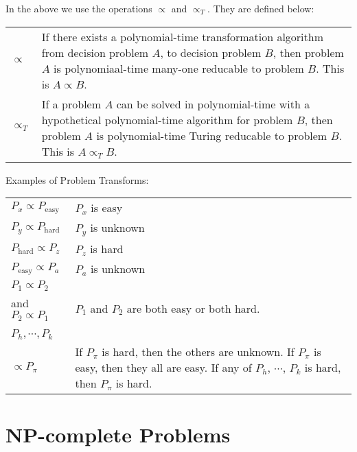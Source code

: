 \documentclass[aip, jmp, amsmath,amssymb, reprint]{revtex4-1}
\theoremstyle{definition}
\begin{document}
In the above we use the operations $\propto$ and $\propto_T$. They are defined below:
\begin{longtable}{p{2.2cm} p{6cm} }
    \textbf{$\propto$} & If there exists a polynomial-time transformation algorithm from decision problem $A$, to decision problem $B$, then
                         problem $A$ is polynomiaal-time many-one reducable to problem $B$. This is $A \propto B$. \\
    \textbf{$\propto_T$} & If a problem $A$ can be solved in polynomial-time with a hypothetical polynomial-time algorithm for problem $B$,
                           then problem $A$ is polynomial-time Turing reducable to problem $B$. This is $A \propto_T B$. \\
\end{longtable}

Examples of Problem Transforms:

\begin{longtable}{p{2.2cm} p{6cm} }
    $P_x \propto P_{\textrm{easy}}$  & $P_x$ is easy \\
    $P_y \propto P_{\textrm{hard}}$  & $P_y$ is unknown \\
    $P_{\textrm{hard}} \propto P_z$  & $P_z$ is hard \\
    $P_{\textrm{easy}} \propto P_a$  & $P_a$ is unknown \\
    $P_1 \propto P_2$ \\ and $P_2 \propto P_1$  & $P_1$ and $P_2$ are both easy or both hard. \\\\
    $P_h,\cdots, P_k$ \\  $\propto P_\pi$  & If $P_\pi$ is hard, then the others are unknown. If $P_\pi$ is easy, then they all are easy.
                                                If any of $ P_h,\, \cdots , \, P_k$ is hard, then $P_\pi$ is hard. \\

\end{longtable}

\section{NP-complete Problems}
\end{document}
